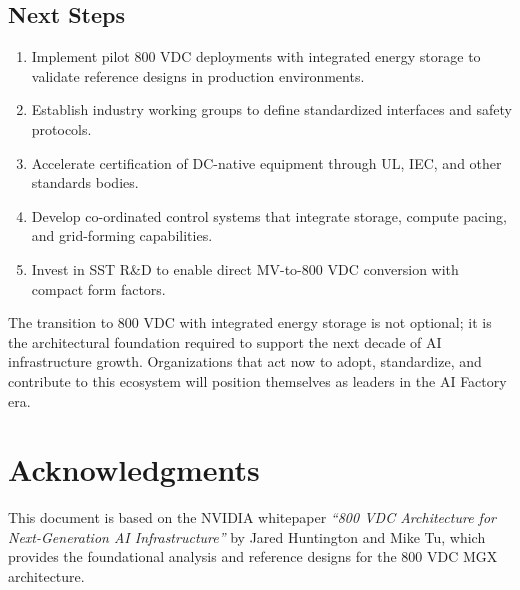 \subsection*{Next Steps}

\begin{enumerate}
\item Implement pilot 800 VDC deployments with integrated energy storage to validate reference designs in production environments.

\item Establish industry working groups to define standardized interfaces and safety protocols.

\item Accelerate certification of DC-native equipment through UL, IEC, and other standards bodies.

\item Develop co-ordinated control systems that integrate storage, compute pacing, and grid-forming capabilities.

\item Invest in SST R\&D to enable direct MV-to-800 VDC conversion with compact form factors.
\end{enumerate}

The transition to 800 VDC with integrated energy storage is not optional; it is the architectural foundation required to support the next decade of AI infrastructure growth. Organizations that act now to adopt, standardize, and contribute to this ecosystem will position themselves as leaders in the AI Factory era.

\section*{Acknowledgments}

This document is based on the NVIDIA whitepaper \textit{``800 VDC Architecture for Next-Generation AI Infrastructure''} by Jared Huntington and Mike Tu, which provides the foundational analysis and reference designs for the 800 VDC MGX architecture.
